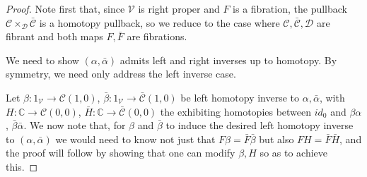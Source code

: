 \documentclass[a4paper,10pt
,draft
]{article}%
\numberwithin{equation}{section}
\numberwithin{figure}{section}
\theoremstyle{definition} %
\newcommand{\V}{\ensuremath{\mathcal V}}
\newcommand{\1}{\ensuremath{\mathbbm 1}}%
\begin{document}
\begin{proof}
Note first that, since $\V$ is right proper and $F$ is a fibration,
the pullback $\mathcal{C} \times_{\mathcal{D}}\bar{\mathcal{C}}$
is a homotopy pullback,
so we reduce to the case 
where $\mathcal{C},\bar{\mathcal{C}},\mathcal{D}$
are fibrant and both maps $F,\bar{F}$ are fibrations.

We need to show $(\alpha,\bar{\alpha})$
admits left and right inverses up to homotopy.
By symmetry, we need only address the left inverse case.

Let
$\beta \colon 1_{\V} \to \mathcal{C}(1,0)$,
$\bar{\beta} \colon 1_{\V} \to \bar{\mathcal{C}}(1,0)$
be left homotopy inverse to $\alpha,\bar{\alpha}$,
with 
$H \colon \mathbb{C} \to \mathcal{C}(0,0)$,
$\bar{H} \colon \mathbb{C} \to \bar{\mathcal{C}}(0,0)$
the exhibiting homotopies between 
$id_0$ and $\beta\alpha$, $\bar{\beta}\bar{\alpha}$.
We now note that, for $\beta$ and $\bar{\beta}$ to induce the desired 
left homotopy inverse to 
$(\alpha,\bar{\alpha})$
we would need to know not just that 
$F\beta=\bar{F}\bar{\beta}$
but also 
$FH=\bar{F}\bar{H}$,
and the proof will follow by showing that one can modify 
$\beta,H$ so as to achieve this.


\end{proof}
\end{document}
